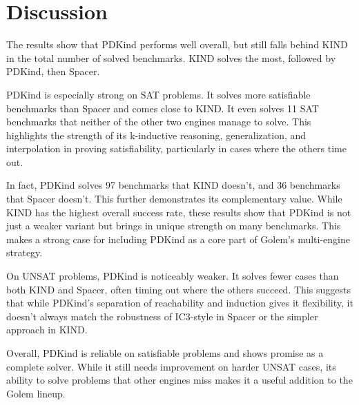 \section{Discussion}
\noindent The results show that PDKind performs well overall, but still falls
behind KIND in the total number of solved benchmarks. KIND solves the most,
followed by PDKind, then Spacer.

PDKind is especially strong on SAT problems. It solves more satisfiable
benchmarks than Spacer and comes close to KIND. It even solves 11 SAT
benchmarks that neither of the other two engines manage to solve. This
highlights the strength of its k-inductive reasoning, generalization, and
interpolation in proving satisfiability, particularly in cases where the others
time out.

In fact, PDKind solves 97 benchmarks that KIND doesn’t, and 36 benchmarks that
Spacer doesn’t. This further demonstrates its complementary value. While KIND
has the highest overall success rate, these results show that PDKind is not
just a weaker variant but brings in unique strength on many benchmarks. This
makes a strong case for including PDKind as a core part of Golem’s multi-engine
strategy.

On UNSAT problems, PDKind is noticeably weaker. It solves fewer cases than both
KIND and Spacer, often timing out where the others succeed. This suggests that
while PDKind’s separation of reachability and induction gives it flexibility,
it doesn’t always match the robustness of IC3-style in Spacer or the simpler
approach in KIND.

\noindent Overall, PDKind is reliable on satisfiable problems and shows promise
as a complete solver. While it still needs improvement on harder UNSAT cases,
its ability to solve problems that other engines miss makes it a useful
addition to the Golem lineup.
